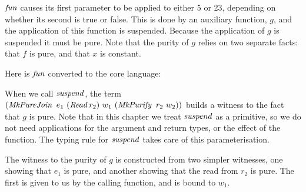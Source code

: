 
$\operatorname{\mathit{fun}}$ causes its first parameter to be applied to either 5 or 23, depending on whether its second is true or false. This is done by an auxiliary function, $g$, and the application of this function is suspended. Because the application of $g$ is suspended it must be pure. Note that the purity of $g$ relies on two separate facts: that $f$ is pure, and that $x$ is constant. 

Here is $\operatorname{\mathit{fun}}$ converted to the core language:

\hspace{-3em}

\vspace{-3ex}
\hspace{-3em}

\vspace{-2ex}
\hspace{-3em}

When we call $\operatorname{\mathit{suspend}}$, the term $(\iMkPureJoin \ e_1 \ (\iRead r_2) \ w_1 \ (\iMkPurify \ r_2 \ w_2))$ builds a witness to the fact that $g$ is pure. Note that in this chapter we treat $\operatorname{\mathit{suspend}}$ as a primitive, so we do not need applications for the argument and return types, or the effect of the function. The typing rule for $\operatorname{\mathit{suspend}}$ takes care of this parameterisation.

The witness to the purity of $g$ is constructed from two simpler witnesses, one showing that $e_1$ is pure, and another showing that the read from $r_2$ is pure. The first is given to us by the calling function, and is bound to $w_1$. 

